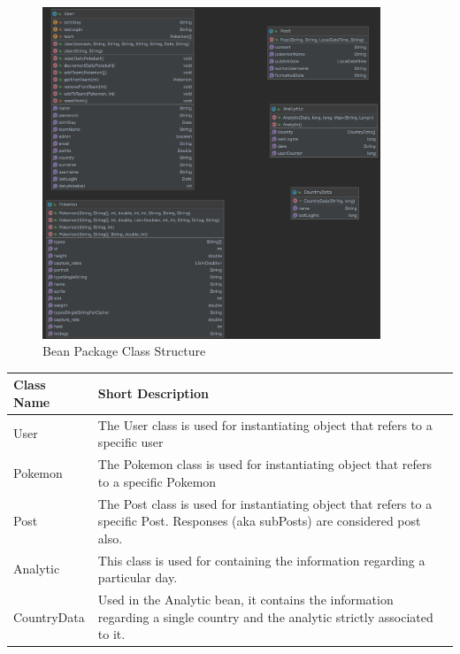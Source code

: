 \begin{figure}[H]
	\centering
	\includegraphics[width=0.9\textwidth]{img/bean_package.png}
	\caption{Bean Package Class Structure}
\end{figure}

\begin{center}
	\begin{tabular}{| m{9em} | m{22em} |} 
		\hline
		\textbf{Class Name} & \textbf{Short Description} \\ [0.5ex] 
		\hline
		User & The User class is used for instantiating object that refers to a specific user\\ 
		\hline
		Pokemon & The Pokemon class is used for instantiating object that refers to a specific Pokemon\\
		\hline
		Post & The Post class is used for instantiating object that refers to a specific Post. Responses (aka subPosts) are considered post also.\\
		\hline
		Analytic & This class is used for containing the information regarding a particular day.\\
		\hline
		CountryData & Used in the Analytic bean, it contains the information regarding a single country and the analytic strictly associated to it.\\
		\hline
	\end{tabular}
\end{center}

